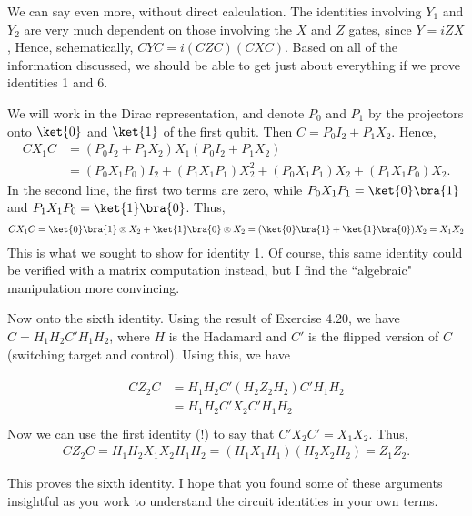 \documentclass{book}
\begin{document}
    We can say even more, without direct calculation. The identities involving $Y_1$ and $Y_2$ are very much dependent on those involving the $X$ and $Z$ gates, since $Y = i ZX$, Hence, schematically, $C Y C = i(C Z C) (CXC)$. Based on all of the information discussed, we should be able to get just about everything if we prove identities 1 and 6. 

    We will work in the Dirac representation, and denote $P_0$ and $P_1$ by the projectors onto $\ket{0}$ and $\ket{1}$ of the first qubit. Then $C = P_0 I_2 + P_1 X_2$. Hence,
    \begin{align}
        C X_1 C &= (P_0 I_2 + P_1 X_2) X_1 (P_0 I_2 + P_1 X_2) \\
        &= (P_0 X_1 P_0) I_2 + (P_1 X_1 P_1) X_2^2 + (P_0 X_1 P_1) X_2 + (P_1 X_1 P_0) X_2.
    \end{align}
    In the second line, the first two terms are zero, while $P_0 X_1 P_1 = \ket{0}\bra{1}$ and $P_1 X_1 P_0 = \ket{1}\bra{0}$. Thus,
    \begin{align}
        C X_1 C = \ket{0}\bra{1} \otimes X_2 +\ket{1}\bra{0}\otimes X_2 = (\ket{0}\bra{1} + \ket{1}\bra{0}) X_2 = X_1 X_2 
    \end{align}
    This is what we sought to show for identity 1. Of course, this same identity could be verified with a matrix computation instead, but I find the ``algebraic" manipulation more convincing.

    Now onto the sixth identity. Using the result of Exercise 4.20, we have $C = H_1 H_2 C' H_1 H_2$, where $H$ is the Hadamard and $C'$ is the flipped version of $C$ (switching target and control). Using this, we have

    \begin{align}
    \begin{aligned}
        C Z_2 C &= H_1 H_2 C' (H_2 Z_2 H_2) C' H_1 H_2 \\
        &= H_1 H_2 C' X_2 C' H_1 H_2 \\
    \end{aligned}
    \end{align}
    Now we can use the first identity (!) to say that $C' X_2 C' = X_1 X_2$. Thus,
    \begin{align}
        C Z_2 C = H_1 H_2 X_1 X_2 H_1 H_2 = (H_1 X_1 H_1) (H_2 X_2 H_2) = Z_1 Z_2.
    \end{align}

    This proves the sixth identity. I hope that you found some of these arguments insightful as you work to understand the circuit identities in your own terms.
    
\end{document}
